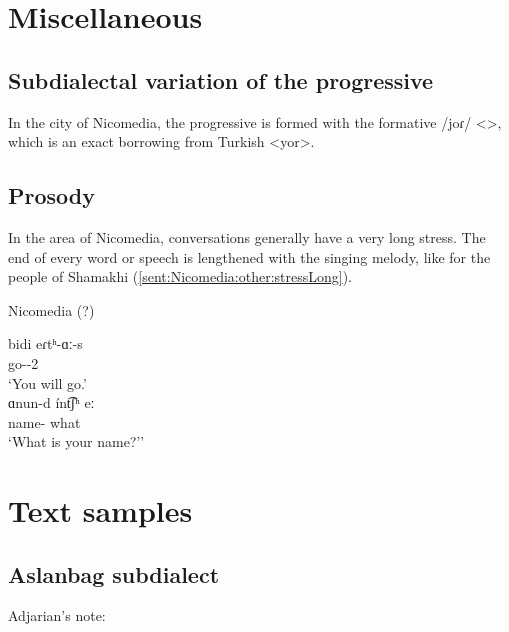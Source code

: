 \section{Miscellaneous}
\subsection{Subdialectal variation of the progressive}

In the city of Nicomedia, the progressive is formed with the formative /joɾ/ <>, which is an exact borrowing from Turkish <yor>.


\subsection{Prosody}

In the area of Nicomedia, conversations generally have a very long stress. The end of every word or speech is lengthened with the singing melody, like for the people of Shamakhi (\ref{sent:Nicomedia:other:stressLong}).


\newpage
\begin{exe}
	\ex Nicomedia (?) \label{sent:Nicomedia:other:stressLong}
	\begin{xlist}
		\ex \gll bidi eɾtʰ-ɑː-s \\
		{\fut} go-{\thgloss}-2{\sg} \\
		\trans `You will go.' \\
		\ex \gll ɑnun-d \'int͡ʃʰ eː \\
		name-{\possSsg} what {\aux}\\ 
		\trans `What is your name?'' \\
	\end{xlist}
\end{exe}



\section{Text samples}

{\sampleoverview}

\subsection{Aslanbag subdialect}
Adjarian's note: \citet[35]{Adjarian-Aslanbeg}


